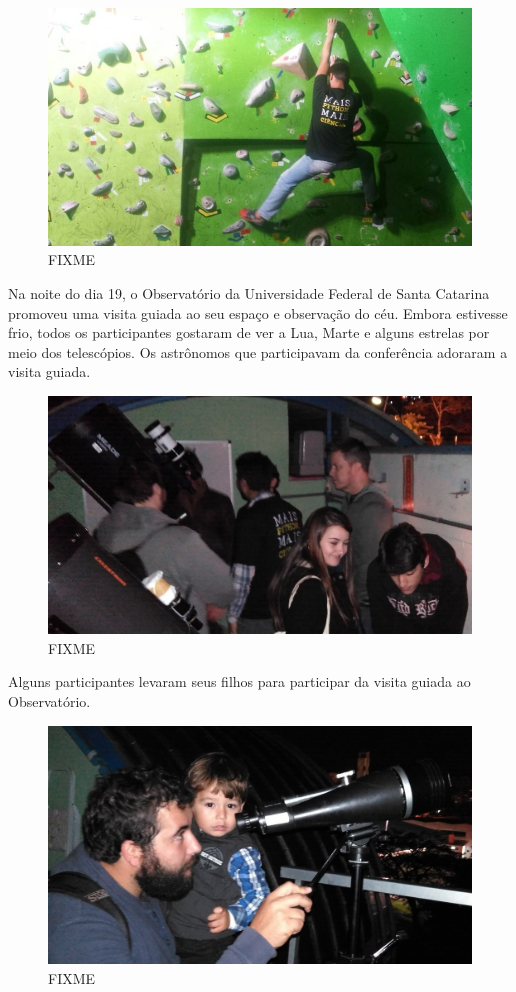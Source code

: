 \documentclass[12pt]{article}
\begin{document}
\begin{figure}[!htb]
\center
\includegraphics[height=.3\textheight]{python-escala.jpg}
\caption{FIXME}
\end{figure}

Na noite do dia 19, o Observatório da Universidade Federal de Santa Catarina
promoveu uma visita guiada ao seu espaço e observação do céu.
Embora estivesse frio, todos os participantes gostaram de ver a Lua, Marte e
alguns estrelas por meio dos telescópios.
Os astrônomos que participavam da conferência adoraram a visita guiada.

\begin{figure}[!htb]
\center
\includegraphics[height=.3\textheight]{social-astro.jpg}
\caption{FIXME}
\end{figure}

Alguns participantes levaram seus filhos para participar da visita guiada ao
Observatório.

\begin{figure}[!htb]
\center
\includegraphics[height=.3\textheight]{social-family.jpg}
\caption{FIXME}
\end{figure}
\end{document}
